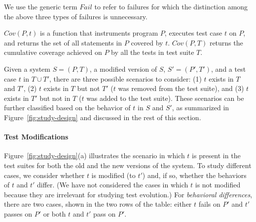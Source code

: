 \documentclass[conference]{IEEEtran}
\newcommand{\mt}{\mathit}
\newcommand{\fail}{\mt{Fail}}
\newcommand{\covfunc}[2]{\mt{Cov(#1, #2)}}
\begin{document}
We use the generic term $\fail$ to refer to failures for which the
distinction among the above three types of failures is unnecessary.

$\covfunc{P}{t}$ is a function that instruments program $P$, executes
test case $t$ on $P$, and returns the set of all statements in $P$
covered by $t$. $\covfunc{P}{T}$ returns the cumulative coverage
achieved on $P$ by all the tests in test suite $T$.



Given a system $S = (P, T)$, a modified version of $S$, $S'=(P', T')$,
and a test case $t$ in $T \cup T'$, there are three possible scenarios
to consider: (1) $t$ exists in $T$ and $T'$, (2) $t$ exists in $T$ but
not $T'$ (\ie $t$ was removed from the test suite), and (3) $t$ exists
in $T'$ but not in $T$ (\ie $t$ was added to the test suite). These
scenarios can be further classified based on the behavior of $t$ in
$S$ and $S'$, as summarized in Figure~\ref{fig:study-design} and
discussed in the rest of this section.

\paragraph*{\textbf{Test Modifications}}
\label{sec:test-mod}

Figure~\ref{fig:study-design}(a) illustrates the scenario in which $t$
is present in the test suites for both the old and the new versions of
the system. To study different cases, we consider whether $t$ is
modified (to $t'$) and, if so, whether the behaviors of $t$ and $t'$
differ. (We have not considered the cases in which $t$ is not modified
because they are irrelevant for studying test evolution.)  For
\textit{behavioral differences}, there are two cases, shown in the two
rows of the table: either $t$ fails on $P'$ and $t'$ passes on $P'$ or
both $t$ and $t'$ pass on $P'$.
\end{document}
